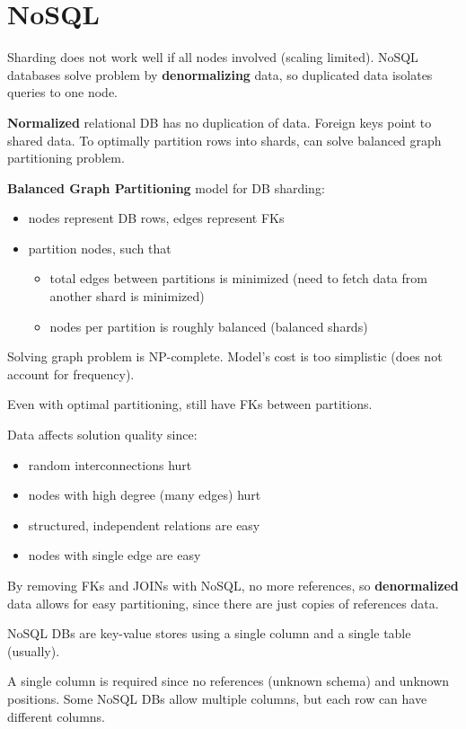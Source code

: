 \documentclass[11pt]{article}
\begin{document}
\section{NoSQL}
\label{sec:org87c03ca}
Sharding does not work well if all nodes involved (scaling limited).
NoSQL databases solve problem by \textbf{denormalizing} data, so duplicated data isolates queries to one node.

\textbf{Normalized} relational DB has no duplication of data.
Foreign keys point to shared data.
To optimally partition rows into shards, can solve balanced graph partitioning problem.

\textbf{Balanced Graph Partitioning} model for DB sharding:
\begin{itemize}
\item nodes represent DB rows, edges represent FKs
\item partition nodes, such that
\begin{itemize}
\item total edges between partitions is minimized (need to fetch data from another shard is minimized)
\item nodes per partition is roughly balanced (balanced shards)
\end{itemize}
\end{itemize}

Solving graph problem is NP-complete.
Model's cost is too simplistic (does not account for frequency).

Even with optimal partitioning, still have FKs between partitions.

Data affects solution quality since:
\begin{itemize}
\item random interconnections hurt
\item nodes with high degree (many edges) hurt
\item structured, independent relations are easy
\item nodes with single edge are easy
\end{itemize}

By removing FKs and JOINs with NoSQL, no more references, so \textbf{denormalized} data allows for easy
partitioning, since there are just copies of references data.

NoSQL DBs are key-value stores using a single column and a single table (usually).

A single column is required since no references (unknown schema) and unknown positions.
Some NoSQL DBs allow multiple columns, but each row can have different columns.
\end{document}
